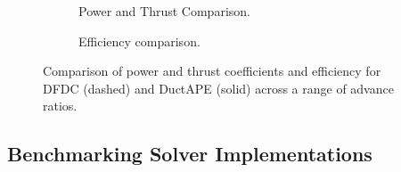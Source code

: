 \begin{figure}[h!]
     \centering
     \begin{subfigure}[t]{0.45\textwidth}
         \centering
        
        \caption{Power and Thrust Comparison.}
        \label{fig:singlerotorcpct}
     \end{subfigure}
\hfill
     \begin{subfigure}[t]{0.45\textwidth}
         \centering
         
         \caption{Efficiency comparison.}
        \label{fig:singlerotoreta}
     \end{subfigure}
    \caption{Comparison of power and thrust coefficients and efficiency for DFDC (dashed) and DuctAPE (solid) across a range of advance ratios.}
    \label{fig:singlerotorcpcteta}
\end{figure}

\subsection{Benchmarking Solver Implementations}
\label{ssec:benchmarking}

